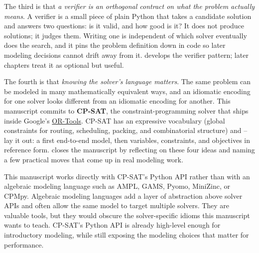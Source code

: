 The third is that \emph{a verifier is an orthogonal contract on what the
problem actually means}. A verifier is a small piece of plain Python
that takes a candidate solution and answers two questions: is it valid,
and how good is it? It does not produce solutions; it judges them.
Writing one is independent of which solver eventually does the search,
and it pins the problem definition down in code so later modeling
decisions cannot drift away from it.  develops the verifier
pattern; later chapters treat it as optional but useful.

The fourth is that \emph{knowing the solver's language matters}. The
same problem can be modeled in many mathematically equivalent ways, and
an idiomatic encoding for one solver looks different from an idiomatic
encoding for another. This manuscript commits to \textbf{CP-SAT}, the
constraint-programming solver that ships inside Google's
\href{https://developers.google.com/optimization}{OR-Tools}. CP-SAT has
an expressive vocabulary (global constraints for routing, scheduling,
packing, and combinatorial structure) and -- lay it out: a
first end-to-end model, then variables, constraints, and objectives in
reference form.  closes the manuscript by reflecting on these
four ideas and naming a few practical moves that come up in real
modeling work.

\begin{platypusinfo}
This manuscript works directly with CP-SAT's Python API
rather than with an algebraic modeling language such as AMPL, GAMS,
Pyomo, MiniZinc, or CPMpy. Algebraic modeling languages add a layer of
abstraction above solver APIs and often allow the same model to target
multiple solvers. They are valuable tools, but they would obscure the
solver-specific idioms this manuscript wants to teach. CP-SAT's Python
API is already high-level enough for introductory modeling, while still
exposing the modeling choices that matter for performance.
\end{platypusinfo}
